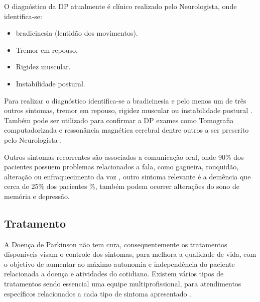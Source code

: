 O diagnóstico da DP atualmente é clínico realizado pelo Neurologista, onde identifica-se:
\begin{itemize}
	\item bradicinesia (lentidão dos movimentos).
	\item Tremor em repouso.
	\item Rigidez muscular.
	\item Instabilidade postural.
\end{itemize}

Para realizar o diagnóstico identifica-se a bradicinesia e pelo menos um de três outros sintomas, tremor em repouso, rigidez muscular ou instabilidade postural \cite{gago2014manual}. Também pode ser utilizado para confirmar a DP exames como Tomografia computadorizada e ressonância magnética cerebral dentre outros a ser prescrito pelo Neurologista \cite{gago2014manual}.

Outros sintomas recorrentes são associados a comunicação oral, onde 90\% dos pacientes possuem problemas relacionados a fala, como gagueira, rouquidão, alteração ou enfraquecimento da voz \cite{zarzur2010laryngeal}, outro sintoma relevante é a demência que cerca de 25\% dos pacientes \cite{pamplona1996demencia}\%, também podem ocorrer alterações do sono de memória e depressão\cite{barbosa2005parkinsons}.

\subsection{Tratamento}
A Doença de Parkinson não tem cura, consequentemente os tratamentos disponíveis visam o controle dos sintomas, para melhora a qualidade de vida, com o objetivo de aumentar ao máximo autonomia e independência do paciente relacionada a doença e atividades do cotidiano. Existem vários tipos de tratamentos sendo essencial uma equipe multiprofissional, para atendimentos específicos relacionados a cada tipo de sintoma apresentado \cite{saito2011doencca}.